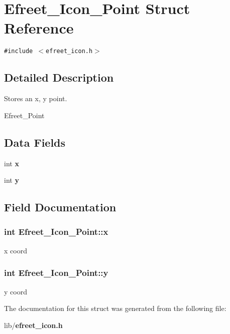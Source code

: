 \section{Efreet\_\-Icon\_\-Point Struct Reference}
\label{structEfreet__Icon__Point}
{\tt \#include $<$efreet\_\-icon.h$>$}



\subsection{Detailed Description}
Stores an x, y point. 

Efreet\_\-Point \subsection*{Data Fields}
\begin{CompactItemize}
\item 
int {\bf x}
\item 
int {\bf y}
\end{CompactItemize}


\subsection{Field Documentation}
\subsubsection{\setlength{\rightskip}{0pt plus 5cm}int {\bf Efreet\_\-Icon\_\-Point::x}}\label{structEfreet__Icon__Point_02bfe9ca93c1e5054b088e5a4602ebd1}


x coord 
\subsubsection{\setlength{\rightskip}{0pt plus 5cm}int {\bf Efreet\_\-Icon\_\-Point::y}}\label{structEfreet__Icon__Point_65c92e8c345949367750c7bd5b436671}


y coord 

The documentation for this struct was generated from the following file:\begin{CompactItemize}
\item 
lib/{\bf efreet\_\-icon.h}\end{CompactItemize}

